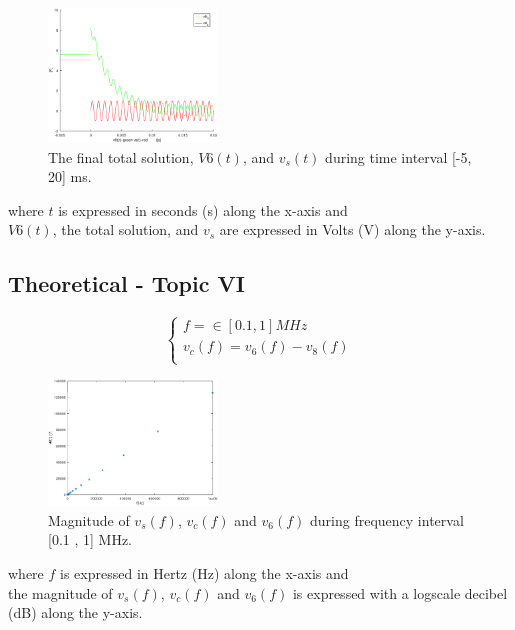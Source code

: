 \begin{figure}[H] \centering
\includegraphics[width=0.4\textwidth]{total.eps}
\caption{The final total solution, $V6(t)$,  and $v_s(t)$ during time interval [-5, 20] ms.}
\label{fig:theo_fifth}
\end{figure}


where $t$ is expressed in seconds (s) along the x-axis and \\
$V6(t)$, the total solution, and $v_s$ are expressed in Volts (V) along the y-axis.


  

\subsection{Theoretical - Topic VI}
\label{subsec:sixth_topic}

\[
\left\{\begin{matrix}
f =\in [0.1 , 1] MHz \\
v_c(f)=v_6(f)-v_8(f) \\
\end{matrix}\right.
\]


\begin{figure}[H] \centering
\includegraphics[width=0.4\textwidth]{magnitude.eps}
\caption{Magnitude of $v_s(f)$,  $v_c(f)$  and $v_6(f)$ during frequency interval [0.1 , 1] MHz.}
\label{fig:LALALAAL}
\end{figure}

where $f$ is expressed in Hertz (Hz) along the x-axis and \\
the magnitude of $v_s(f)$,  $v_c(f)$  and $v_6(f)$ is expressed with a logscale decibel (dB) along the y-axis.

